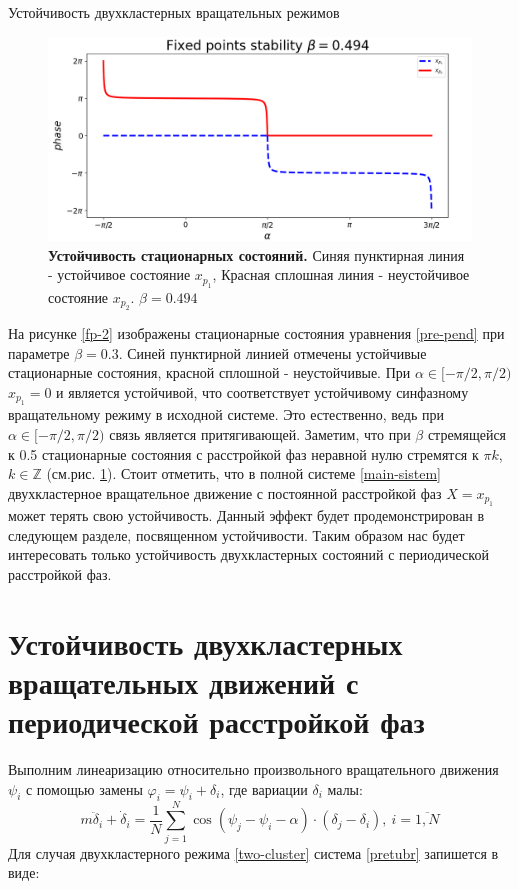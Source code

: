 \begin{chapter}{Устойчивость двухкластерных вращательных режимов}
	\begin{figure}[h!]
		\begin{center}
			\includegraphics[width=1\columnwidth]{pictures/fixed-points-3.png}
		\end{center}
		\caption{\textbf{Устойчивость стационарных состояний.}
		Синяя пунктирная линия - устойчивое состояние $x_{p_1}$,
		Красная сплошная линия - неустойчивое состояние $x_{p_2}$.
		$\beta = 0.494$}
		\label{fp-3}
	\end{figure}

	На рисунке \ref{fp-2} изображены стационарные состояния уравнения \ref{pre-pend} при параметре $\beta = 0.3$.
	Синей пунктирной линией отмечены устойчивые стационарные состояния,
	красной сплошной - неустойчивые. При $\alpha \in [-\pi/2, \pi/2)$ $x_{p_1} = 0$ и является устойчивой, что соответствует
	устойчивому синфазному вращательному режиму в исходной системе. Это естественно, ведь при $\alpha \in [-\pi/2, \pi/2)$ связь является
	притягивающей. Заметим, что при $\beta$ стремящейся к 0.5 стационарные состояния с расстройкой фаз неравной нулю стремятся
	к $\pi k$, $k \in \mathbb{Z}$ (см.рис. \ref{fp-3}).
	Стоит отметить, что в полной системе \ref{main-sistem} двухкластерное вращательное движение с постоянной расстройкой фаз $X = x_{p_1}$
	может терять свою устойчивость. Данный эффект будет продемонстрирован в следующем разделе, посвященном устойчивости.
	Таким образом нас будет интересовать только устойчивость двухкластерных состояний с периодической расстройкой фаз.
	
	\section{Устойчивость двухкластерных вращательных движений с периодической расстройкой фаз}

	Выполним линеаризацию относительно произвольного вращательного движения $\psi_i$ с помощью замены $\varphi_i = \psi_i + \delta_i$, где вариации $\delta_i$ малы:
	\begin{equation} \label{pretubr}
		m\ddot{\delta}_i + \dot{\delta}_i = \frac{1}{N} \sum_{j = 1}^N \cos{(\psi_j - \psi_i - \alpha)} \cdot (\delta_j - \delta_i), \ i = \overline{1, N}
	\end{equation}
	Для случая двухкластерного режима \ref{two-cluster} система \ref{pretubr} запишется в виде:
	

\end{chapter}
